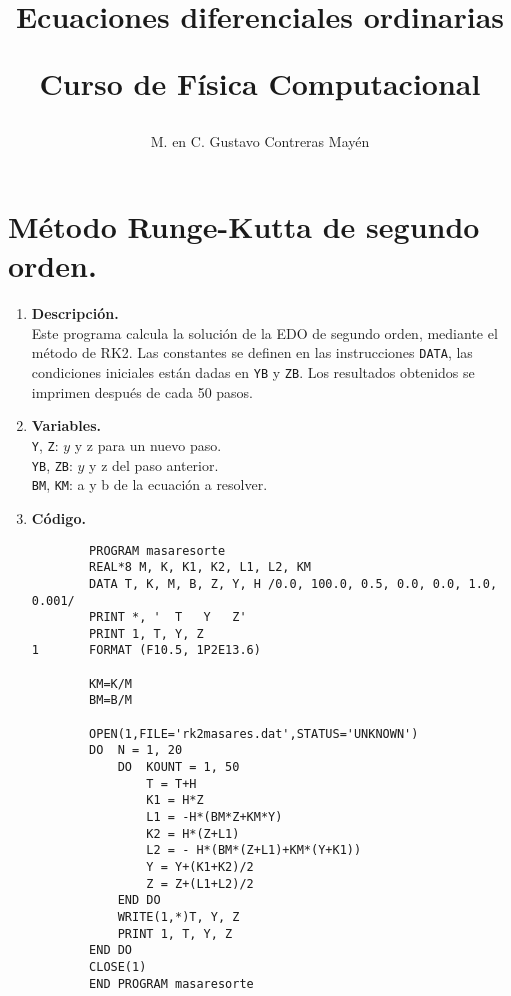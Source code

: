\documentclass[11pt]{article}
\title{Ecuaciones diferenciales ordinarias \\ \begin{large}Curso de Física Computacional\end{large}}
\author{M. en C. Gustavo Contreras Mayén}
\date{ }
\begin{document}
\maketitle
\section*{Método Runge-Kutta de segundo orden.}
\begin{enumerate}
\item \textbf{Descripción.}\\
Este programa calcula la solución de la EDO de segundo orden, mediante el método de RK2. Las constantes se definen en las instrucciones \texttt{DATA}, las condiciones iniciales están dadas en \texttt{YB} y \texttt{ZB}. Los resultados obtenidos se imprimen después de cada 50 pasos.
\item \textbf{Variables.}\\
\texttt{Y}, \texttt{Z}: $y$ y z para un nuevo paso. \\
\texttt{YB}, \texttt{ZB}: $y$ y z del paso anterior. \\
\texttt{BM}, \texttt{KM}: a y b de la ecuación a resolver.
\item \textbf{Código.}
\begin{lstlisting}
		PROGRAM masaresorte
		REAL*8 M, K, K1, K2, L1, L2, KM
		DATA T, K, M, B, Z, Y, H /0.0, 100.0, 0.5, 0.0, 0.0, 1.0, 0.001/
		PRINT *, '	T	Y	Z'
		PRINT 1, T, Y, Z
1		FORMAT (F10.5, 1P2E13.6)

		KM=K/M
		BM=B/M

		OPEN(1,FILE='rk2masares.dat',STATUS='UNKNOWN')
		DO 	N = 1, 20
			DO 	KOUNT = 1, 50
				T = T+H
				K1 = H*Z
				L1 = -H*(BM*Z+KM*Y)
				K2 = H*(Z+L1)
				L2 = - H*(BM*(Z+L1)+KM*(Y+K1))
				Y = Y+(K1+K2)/2
				Z = Z+(L1+L2)/2
			END DO
			WRITE(1,*)T, Y, Z
			PRINT 1, T, Y, Z
		END DO
		CLOSE(1)
		END PROGRAM masaresorte
\end{lstlisting}
\end{enumerate}
\end{document}
